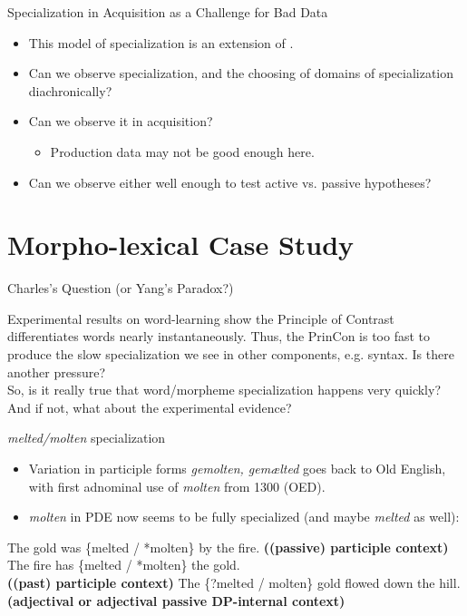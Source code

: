 \documentclass[hyperref={pdfpagelabels=false}]{beamer}
\begin{document}
\begin{frame}{Specialization in Acquisition as a Challenge for Bad Data}
		\begin{itemize}
			\item This model of specialization is an extension of \citet{yang2000, yang2002}.
			\item Can we observe specialization, and the choosing of domains of specialization diachronically?
			\item Can we observe it in acquisition?
				\begin{itemize}
					\item Production data may not be good enough here.
				\end{itemize}
			\item Can we observe either well enough to test active vs. passive hypotheses?
		\end{itemize}
\end{frame}

\section{Morpho-lexical Case Study}


\begin{frame}{Charles's Question (or Yang's Paradox?)}
		\begin{center}
			Experimental results on word-learning show the Principle of Contrast differentiates words nearly instantaneously. Thus, the PrinCon is too fast to produce the slow specialization we see in other components, e.g. syntax. Is there another pressure?\\
			\vspace*{5mm}
			So, is it really true that word/morpheme specialization happens very quickly? And if not, what about the experimental evidence?
		\end{center}
\end{frame}

\begin{frame}{\textsl{melted/molten} specialization}
\begin{itemize}
\item Variation in participle forms \textsl{gemolten, gemælted} goes back to Old English, with first adnominal use of \textsl{molten} from 1300 (OED).
\item \textsl{molten} in PDE now seems to be fully specialized (and maybe \textsl{melted} as well):
\end{itemize}
\begin{exe}
	\ex The gold was \{melted / *molten\} by the fire. \textbf{((passive) participle context)}
	\ex The fire has  \{melted / *molten\} the gold.\\\textbf{((past) participle context)}
	\ex The \{?melted / molten\} gold flowed down the hill. \textbf{(adjectival or adjectival passive DP-internal context)}
\end{exe}

\end{frame}
\end{document}
